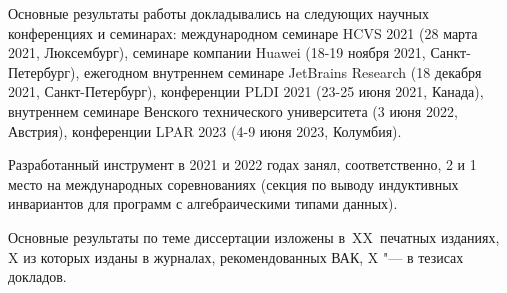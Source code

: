 {\probation}
Основные результаты работы докладывались на следующих научных конференциях и семинарах:
международном семинаре HCVS 2021 (28 марта 2021, Люксембург),
семинаре компании Huawei (18-19 ноября 2021, Санкт-Петербург),
ежегодном внутреннем семинаре JetBrains Research (18 декабря 2021, Санкт-Петербург),
конференции PLDI 2021 (23-25 июня 2021, Канада),
внутреннем семинаре Венского технического университета (3 июня 2022, Австрия),
конференции LPAR 2023 (4-9 июня 2023, Колумбия).

Разработанный инструмент в 2021 и 2022 годах занял, соответственно, 2 и 1 место на международных соревнованиях \chccomp{} (секция по  выводу индуктивных инвариантов для программ с алгебраическими типами данных).


{%
    {\publications} Основные результаты по теме диссертации изложены
    в~XX~печатных изданиях,
    X из которых изданы в журналах, рекомендованных ВАК,
    X "--- в тезисах докладов.
}%
